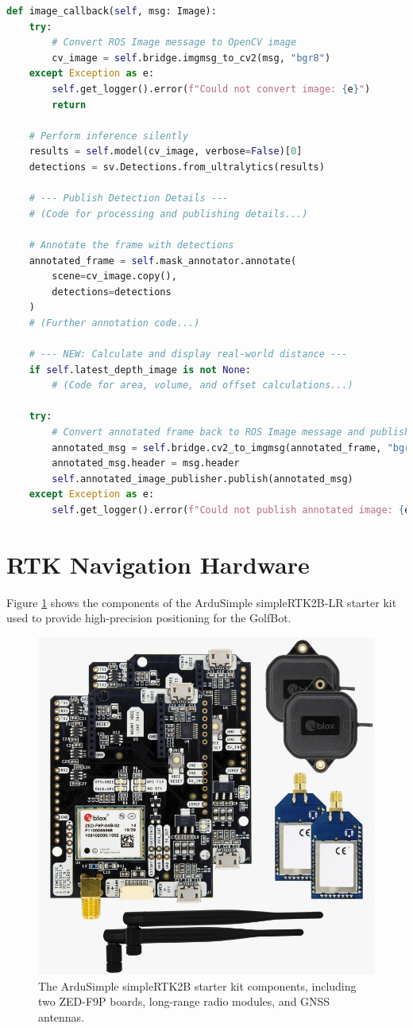 \begin{lstlisting}[language=Python, caption={Primary image callback and processing logic from \texttt{divot\_detector\_intel.py}.}, label={lst:detector_node}]
def image_callback(self, msg: Image):
    try:
        # Convert ROS Image message to OpenCV image
        cv_image = self.bridge.imgmsg_to_cv2(msg, "bgr8")
    except Exception as e:
        self.get_logger().error(f"Could not convert image: {e}")
        return

    # Perform inference silently
    results = self.model(cv_image, verbose=False)[0]
    detections = sv.Detections.from_ultralytics(results)

    # --- Publish Detection Details ---
    # (Code for processing and publishing details...)

    # Annotate the frame with detections
    annotated_frame = self.mask_annotator.annotate(
        scene=cv_image.copy(),
        detections=detections
    )
    # (Further annotation code...)

    # --- NEW: Calculate and display real-world distance ---
    if self.latest_depth_image is not None:
        # (Code for area, volume, and offset calculations...)
        
    try:
        # Convert annotated frame back to ROS Image message and publish
        annotated_msg = self.bridge.cv2_to_imgmsg(annotated_frame, "bgr8")
        annotated_msg.header = msg.header
        self.annotated_image_publisher.publish(annotated_msg)
    except Exception as e:
        self.get_logger().error(f"Could not publish annotated image: {e}")
\end{lstlisting}


\section{RTK Navigation Hardware}
\label{sec:appendix_rtk_hardware}
Figure \ref{fig:appendix_ardusimple_kit} shows the components of the ArduSimple simpleRTK2B-LR starter kit used to provide high-precision positioning for the GolfBot.

\begin{figure}[h!]
    \centering
    \includegraphics[width=0.6\linewidth]{figures/ardusimple.png}
    \caption{The ArduSimple simpleRTK2B starter kit components, including two ZED-F9P boards, long-range radio modules, and GNSS antennas.}
    \label{fig:appendix_ardusimple_kit}
\end{figure}

